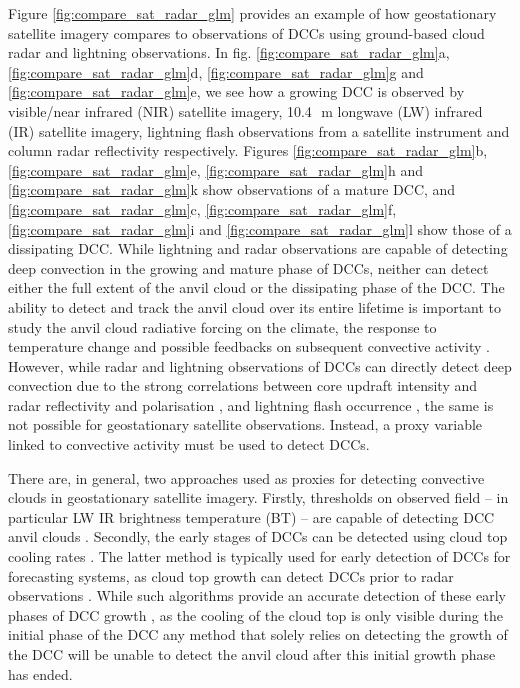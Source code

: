 Figure \ref{fig:compare_sat_radar_glm} provides an example of how geostationary satellite imagery compares to observations of DCCs using ground-based cloud radar and lightning observations.
In fig. \ref{fig:compare_sat_radar_glm}a, \ref{fig:compare_sat_radar_glm}d, \ref{fig:compare_sat_radar_glm}g and \ref{fig:compare_sat_radar_glm}e, we see how a growing DCC is observed by visible/near infrared (NIR) satellite imagery, 10.4\,\unit{\mu m} longwave (LW) infrared (IR) satellite imagery, lightning flash observations from a satellite instrument and column radar reflectivity respectively.
Figures \ref{fig:compare_sat_radar_glm}b, \ref{fig:compare_sat_radar_glm}e, \ref{fig:compare_sat_radar_glm}h and \ref{fig:compare_sat_radar_glm}k show observations of a mature DCC, and \ref{fig:compare_sat_radar_glm}c, \ref{fig:compare_sat_radar_glm}f, \ref{fig:compare_sat_radar_glm}i and \ref{fig:compare_sat_radar_glm}l show those of a dissipating DCC.
While lightning and radar observations are capable of detecting deep convection in the growing and mature phase of DCCs, neither can detect either the full extent of the anvil cloud or the dissipating phase of the DCC.
The ability to detect and track the anvil cloud over its entire lifetime is important to study the anvil cloud radiative forcing on the climate, the response to temperature change \citep{bony_thermodynamic_2016, hartmann_tropical_2016, ceppi_cloud_2017, gasparini_what_2019} and possible feedbacks on subsequent convective activity \citep{varble_erroneous_2018}.
However, while radar and lightning observations of DCCs can directly detect deep convection due to the strong correlations between core updraft intensity and radar reflectivity and polarisation \citep{austin_relation_1987, rosenfeld_general_1993, zipser_vertical_1994},  and lightning flash occurrence \citep{williams_relationship_1989, deierling_total_2008, wang_relationship_2017}, the same is not possible for geostationary satellite observations.
Instead, a proxy variable linked to convective activity must be used to detect DCCs.

There are, in general, two approaches used as proxies for detecting convective clouds in geostationary satellite imagery. 
Firstly, thresholds on observed field -- in particular LW IR brightness temperature (BT) -- are capable of detecting DCC anvil clouds \citep[e.g.][]{schmetz_monitoring_1997, hong_detection_2005, schroder_deep_2009, liang_integrated_2017, senf_size-resolved_2018}.
Secondly, the early stages of DCCs can be detected using cloud top cooling rates \citep{zinner_cb-tram:_2008, bedka_objective_2010, muller_novel_2019}.
The latter method is typically used for early detection of DCCs for forecasting systems, as cloud top growth can detect DCCs prior to radar observations \citep{roberts_nowcasting_2003}.
While such algorithms provide an accurate detection of these early phases of DCC growth \citep{zinner_validation_2013}, as the cooling of the cloud top is only visible during the initial phase of the DCC any method that solely relies on detecting the growth of the DCC will be unable to detect the anvil cloud after this initial growth phase has ended.

